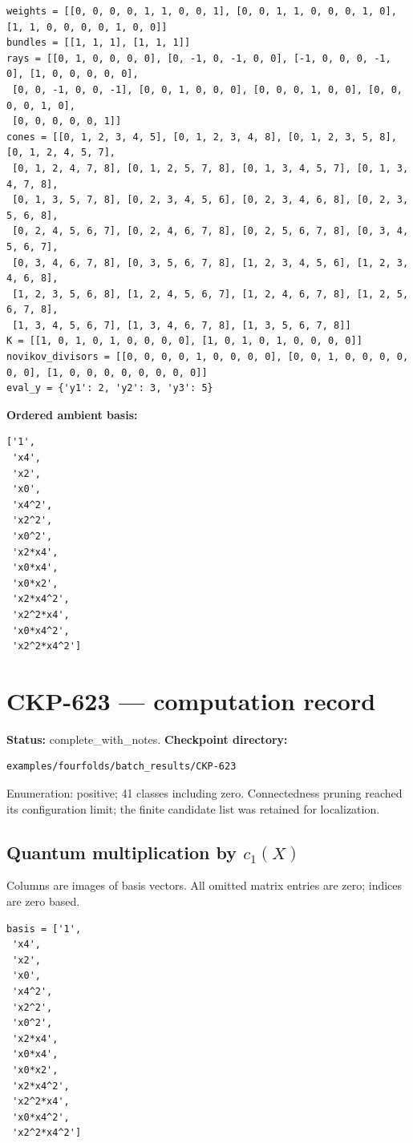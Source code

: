 \documentclass[10pt,a4paper]{article}
\begin{document}
\begin{lstlisting}
weights = [[0, 0, 0, 0, 1, 1, 0, 0, 1], [0, 0, 1, 1, 0, 0, 0, 1, 0], [1, 1, 0, 0, 0, 0, 1, 0, 0]]
bundles = [[1, 1, 1], [1, 1, 1]]
rays = [[0, 1, 0, 0, 0, 0], [0, -1, 0, -1, 0, 0], [-1, 0, 0, 0, -1, 0], [1, 0, 0, 0, 0, 0],
 [0, 0, -1, 0, 0, -1], [0, 0, 1, 0, 0, 0], [0, 0, 0, 1, 0, 0], [0, 0, 0, 0, 1, 0],
 [0, 0, 0, 0, 0, 1]]
cones = [[0, 1, 2, 3, 4, 5], [0, 1, 2, 3, 4, 8], [0, 1, 2, 3, 5, 8], [0, 1, 2, 4, 5, 7],
 [0, 1, 2, 4, 7, 8], [0, 1, 2, 5, 7, 8], [0, 1, 3, 4, 5, 7], [0, 1, 3, 4, 7, 8],
 [0, 1, 3, 5, 7, 8], [0, 2, 3, 4, 5, 6], [0, 2, 3, 4, 6, 8], [0, 2, 3, 5, 6, 8],
 [0, 2, 4, 5, 6, 7], [0, 2, 4, 6, 7, 8], [0, 2, 5, 6, 7, 8], [0, 3, 4, 5, 6, 7],
 [0, 3, 4, 6, 7, 8], [0, 3, 5, 6, 7, 8], [1, 2, 3, 4, 5, 6], [1, 2, 3, 4, 6, 8],
 [1, 2, 3, 5, 6, 8], [1, 2, 4, 5, 6, 7], [1, 2, 4, 6, 7, 8], [1, 2, 5, 6, 7, 8],
 [1, 3, 4, 5, 6, 7], [1, 3, 4, 6, 7, 8], [1, 3, 5, 6, 7, 8]]
K = [[1, 0, 1, 0, 1, 0, 0, 0, 0], [1, 0, 1, 0, 1, 0, 0, 0, 0]]
novikov_divisors = [[0, 0, 0, 0, 1, 0, 0, 0, 0], [0, 0, 1, 0, 0, 0, 0, 0, 0], [1, 0, 0, 0, 0, 0, 0, 0, 0]]
eval_y = {'y1': 2, 'y2': 3, 'y3': 5}
\end{lstlisting}

\textbf{Ordered ambient basis:}
\begin{lstlisting}
['1',
 'x4',
 'x2',
 'x0',
 'x4^2',
 'x2^2',
 'x0^2',
 'x2*x4',
 'x0*x4',
 'x0*x2',
 'x2*x4^2',
 'x2^2*x4',
 'x0*x4^2',
 'x2^2*x4^2']
\end{lstlisting}

\clearpage\section*{CKP-623 --- computation record}
\textbf{Status:} complete\_with\_notes.
\textbf{Checkpoint directory:}
\begin{lstlisting}
examples/fourfolds/batch_results/CKP-623
\end{lstlisting}

Enumeration: positive; 41 classes including zero.
Connectedness pruning reached its configuration limit; the finite candidate list was retained for localization.
\subsection*{Quantum multiplication by $c_1(X)$}
Columns are images of basis vectors. All omitted matrix entries are zero; indices are zero based.

\begin{lstlisting}
basis = ['1',
 'x4',
 'x2',
 'x0',
 'x4^2',
 'x2^2',
 'x0^2',
 'x2*x4',
 'x0*x4',
 'x0*x2',
 'x2*x4^2',
 'x2^2*x4',
 'x0*x4^2',
 'x2^2*x4^2']
\end{lstlisting}
\end{document}
